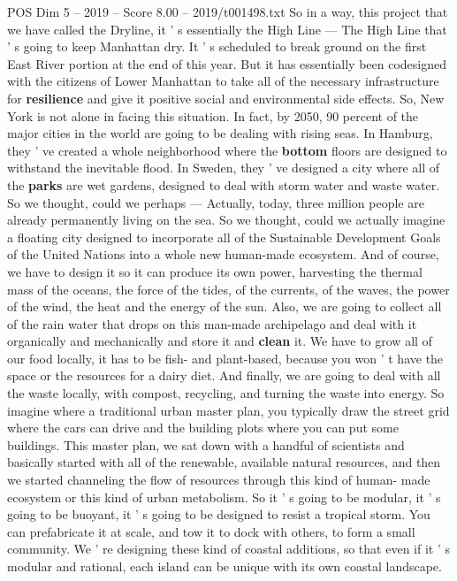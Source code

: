 \begin{textsample}{POS Dim 5 – 2019 – Score 8.00 – 2019/t001498.txt}
So in a way, this project that we have called the Dryline, it ' s essentially the High Line — The High Line that ' s going to keep Manhattan dry.
It ' s scheduled to break ground on the first East River portion at the end of this year.
But it has essentially been codesigned with the citizens of Lower Manhattan to take all of the necessary infrastructure for \textbf{resilience} and give it positive social and environmental side effects.
So, New York is not alone in facing this situation.
In fact, by 2050, 90 percent of the major cities in the world are going to be dealing with rising seas.
In Hamburg, they ' ve created a whole neighborhood where the \textbf{bottom} floors are designed to withstand the inevitable flood.
In Sweden, they ' ve designed a city where all of the \textbf{parks} are wet gardens, designed to deal with storm water and waste water.
So we thought, could we perhaps — Actually, today, three million people are already permanently living on the sea.
So we thought, could we actually imagine a floating city designed to incorporate all of the Sustainable Development Goals of the United Nations into a whole new human-made ecosystem.
And of course, we have to design it so it can produce its own power, harvesting the thermal mass of the oceans, the force of the tides, of the currents, of the waves, the power of the wind, the heat and the energy of the sun.
Also, we are going to collect all of the rain water that drops on this man-made archipelago and deal with it organically and mechanically and store it and \textbf{clean} it.
We have to grow all of our food locally, it has to be fish- and plant-based, because you won ' t have the space or the resources for a dairy diet.
And finally, we are going to deal with all the waste locally, with compost, recycling, and turning the waste into energy.
So imagine where a traditional urban master plan, you typically draw the street grid where the cars can drive and the building plots where you can put some buildings.
This master plan, we sat down with a handful of scientists and basically started with all of the renewable, available natural resources, and then we started channeling the flow of resources through this kind of human- made ecosystem or this kind of urban metabolism.
So it ' s going to be modular, it ' s going to be buoyant, it ' s going to be designed to resist a tropical storm.
You can prefabricate it at scale, and tow it to dock with others, to form a small community.
We ' re designing these kind of coastal additions, so that even if it ' s modular and rational, each island can be unique with its own coastal landscape.

\end{textsample}
